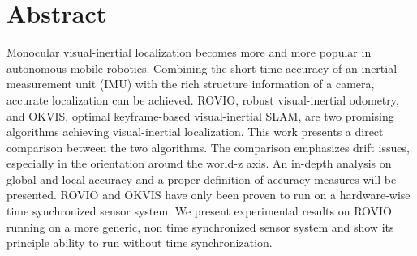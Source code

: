 \chapter*{Abstract}

Monocular visual-inertial localization becomes more and more popular in autonomous mobile robotics. Combining the short-time accuracy of an inertial measurement unit (IMU) with the rich structure information of a camera, accurate localization can be achieved. ROVIO, robust visual-inertial odometry, and OKVIS, optimal keyframe-based visual-inertial SLAM, are two promising algorithms achieving visual-inertial localization. This work presents a direct comparison between the two algorithms. The comparison emphasizes drift issues, especially in the orientation around the world-z axis. An in-depth analysis on global and local accuracy and a proper definition of accuracy measures will be presented. ROVIO and OKVIS have only been proven to run on a hardware-wise time synchronized sensor system. We present experimental results on ROVIO running on a more generic, non time synchronized sensor system and show its principle ability to run without time synchronization.










